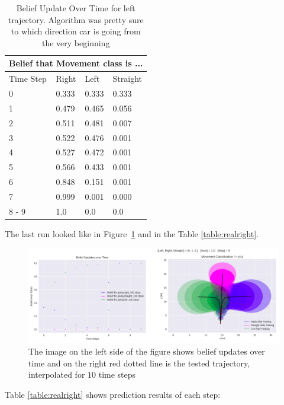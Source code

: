 \begin{table}[H]
	\centering
	\begin{tabular}{ |p{1.5cm}||p{1.5cm}|p{1.5cm}|p{1.5cm}|}
		\hline
		\multicolumn{4}{|c|}{Belief that Movement class is ...} \\
		\hline
		Time Step & Right & Left & Straight \\
		\hline
		0 & 0.333 & 0.333 & 0.333 \\
		1 & 0.479 & 0.465 & 0.056 \\
		2 & 0.511 & 0.481 & 0.007 \\
		3 & 0.522 & 0.476 & 0.001 \\
		4 & 0.527 & 0.472 & 0.001 \\
		5 & 0.566 & 0.433 & 0.001 \\
		6 & 0.848 & 0.151 & 0.001 \\
		7 & 0.999 & 0.001 & 0.000 \\
		8 - 9 & 1.0   & 0.0   & 0.0 \\
		\hline
	\end{tabular}
	\caption{Belief Update Over Time for left trajectory. Algorithm was pretty sure to which direction car is going from the very beginning}
	\label{table:realleft}
\end{table}

The last run looked like in Figure~\ref{fig:Realright} and in the Table \ref{table:realright}.

\begin{figure}[H]
	\centering  	
	\includegraphics[width=12cm]{img/realRight.png}
	\caption{The image on the left side of the figure shows belief updates over time and on the right red dotted line is the tested trajectory, interpolated for $10$ time steps}
	\label{fig:Realright}    
\end{figure}

Table \ref{table:realright} shows prediction results of each step:

